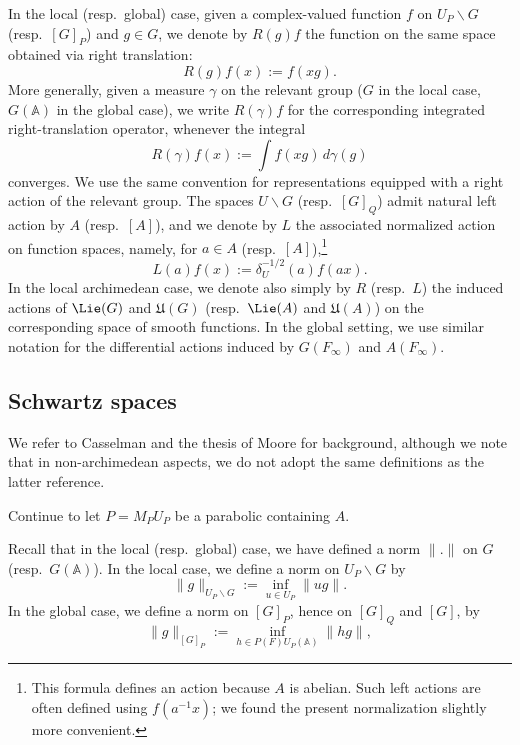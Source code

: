 In the local (resp.\ global) case, given a complex-valued function $f$ on $U_P \backslash G$ (resp.\ $[G]_P$) and $g \in G$, we denote by $R(g) f$ the function on the same space obtained via  right translation:
\begin{equation*}
  R(g) f(x) := f(x g).
\end{equation*}
More generally, given a measure $\gamma$ on the relevant group ($G$ in the local case, $G(\mathbb{A})$ in the global case), we write $R(\gamma) f$ for the corresponding integrated right-translation operator, whenever the integral
\begin{equation*}
  R(\gamma) f(x) := \int f(x g) \, d \gamma(g)
\end{equation*}
converges.  We use the same convention for representations equipped with a right action of the relevant group.
The spaces $U \backslash G$ (resp.\ $[G]_Q$) admit natural left action by $A$ (resp.\ $[A]$), and we denote by $L$ the associated normalized action on function spaces, namely, for $a \in A$ (resp.\ $[A]$),\footnote{ This formula defines an action because $A$ is abelian.  Such left actions are often defined using $f(a^{-1} x)$; we found the present normalization slightly more convenient.  } 
\begin{equation}\label{eq:normalized-left-translation}
  L(a) f(x) :=
  \delta_U^{-1/2}(a)
  f(a x).
\end{equation}
In the local archimedean case, we denote also simply by $R$ (resp.\ $L$) the induced actions of $\Lie(G)$ and $\mathfrak{U}(G)$ (resp.\ $\Lie(A)$ and $\mathfrak{U}(A)$) on the corresponding space of smooth functions.  In the global setting, we use similar notation for the differential actions induced by $G(F_\infty)$ and $A(F_\infty)$.

\subsection{Schwartz spaces}\label{sec:schwartz-spaces}
We refer to Casselman \cite{MR1001613} and the thesis of Moore \cite{MooreOSU2018} for background, although we note that in non-archimedean aspects, we do not adopt the same definitions as the latter reference.

Continue to let $P = M_P U_P$ be a parabolic containing $A$.

Recall that in the local (resp.\ global) case, we have defined a norm $\|.\|$ on $G$ (resp.\ $G(\mathbb{A})$).  In the local case, we define a norm on $U_P \backslash G$ by
\begin{equation*}
  \|g\|_{U_P \backslash G} := \inf_{u \in U_P} \|u g\|.
\end{equation*}
In the global case, we define a norm on $[G]_P$, hence on $[G]_Q$ and $[G]$, by
\begin{equation}\label{eq:g_g-:=-inf_gamma}
  \|g\|_{[G]_P} := \inf_{h \in P(F) U_P(\mathbb{A})} \|h g\|,
\end{equation}

